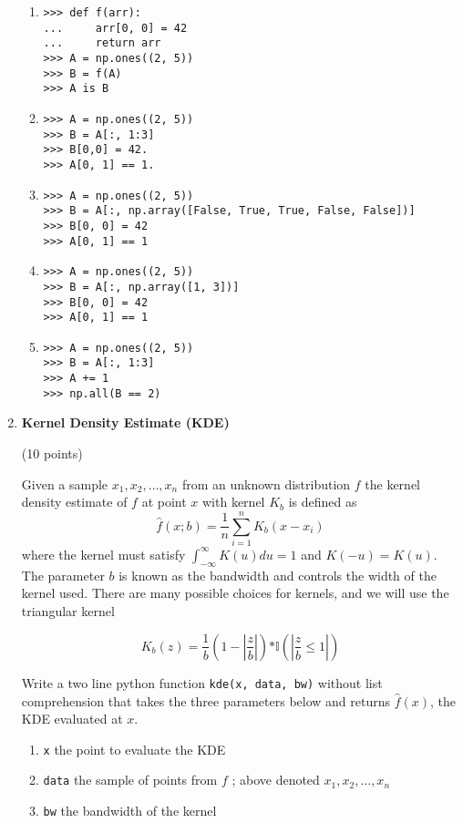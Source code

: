 \documentclass{article}
\newcounter{points}
\newcommand\setpoints[1]{\addtocounter{points}{#1}(#1 points)}
\begin{document}
\begin{enumerate}
\begin{enumerate}
\item  

\begin{verbatim}
>>> def f(arr):
...     arr[0, 0] = 42
...     return arr
>>> A = np.ones((2, 5))
>>> B = f(A)
>>> A is B
\end{verbatim}

\item  

\begin{verbatim}
>>> A = np.ones((2, 5))
>>> B = A[:, 1:3]
>>> B[0,0] = 42.
>>> A[0, 1] == 1.
\end{verbatim}

\item  

\begin{verbatim}
>>> A = np.ones((2, 5))
>>> B = A[:, np.array([False, True, True, False, False])]
>>> B[0, 0] = 42
>>> A[0, 1] == 1
\end{verbatim}


\item  

\begin{verbatim}
>>> A = np.ones((2, 5))
>>> B = A[:, np.array([1, 3])]
>>> B[0, 0] = 42
>>> A[0, 1] == 1
\end{verbatim}

\item  

\begin{verbatim}
>>> A = np.ones((2, 5))
>>> B = A[:, 1:3]
>>> A += 1
>>> np.all(B == 2)
\end{verbatim}
\end{enumerate}


\newpage
\item \textbf{Kernel Density Estimate (KDE)} \setpoints{10}

Given a sample $x_1, x_2, \dots, x_n$ from an unknown distribution $f$ the kernel density estimate of $f$ at point $x$ with kernel $K_b$ is defined as 
$$\hat{f}(x;b) = \frac{1}{n}\sum_{i=1}^{n}K_b(x-x_i)$$
where the kernel must satisfy $\int_{-\infty}^{\infty}K(u)du = 1$ and $K(-u) = K(u).$ The parameter $b$ is known as the bandwidth and controls the width of the kernel used. There are many possible choices for kernels, and we will use the triangular kernel

$$K_{b}(z) = \frac{1}{b}(1 - |\frac{z}{b}|)\mathbb{*I}(|\frac{z}{b} \leq 1|)$$ 

Write a two line python function \texttt{kde(x, data, bw)} without list comprehension that takes the three parameters below and returns $\hat{f}(x)$, the KDE evaluated at $x$.
\begin{enumerate}
\item \texttt{x} the point to evaluate the KDE
\item \texttt{data}  the sample of points from $f$  ; above denoted $x_1, x_2, \dots, x_n$ 
\item \texttt{bw} the bandwidth of the kernel
\end{enumerate}


\end{enumerate}
\end{document}
